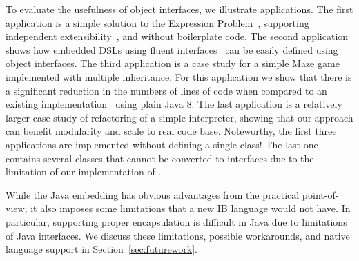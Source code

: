 
To evaluate the usefulness of object interfaces, we illustrate
\numOfCaseStudies {} 
applications. The first application is a simple 
solution to the Expression Problem~\cite{wadler98expression}, supporting independent 
extensibility~\cite{zenger05independentlyextensible}, and without boilerplate code. The second
application shows how embedded DSLs using fluent interfaces~\cite{fowler2005fluentinterface} 
can be easily defined using object interfaces. The third
application is a case study for a simple Maze game implemented with 
multiple inheritance. For this application we show that there is a
significant reduction in the numbers of lines of code when compared 
to an existing implementation~\cite{bono14} using plain Java 8. The last
application is a relatively larger case study of refactoring of a simple interpreter, showing that our
approach can benefit modularity and scale to real code base. Noteworthy, the first three applications are implemented 
without defining a single class! The last one contains several classes that cannot be 
converted to interfaces due to the limitation of our implementation of \mixin.

While the Java embedding has obvious advantages from the practical
point-of-view, it also imposes some limitations that a new IB language
would not have. In particular, supporting proper encapsulation is
difficult in Java due to limitations of Java interfaces. We discuss
these limitations, possible workarounds, and native language support in Section~\ref{sec:futurework}.

